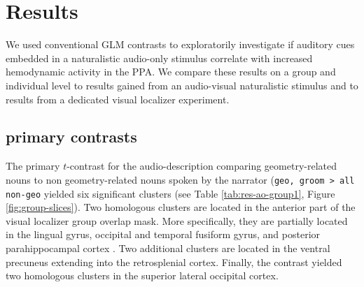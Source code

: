 \documentclass[english]{article}
\begin{document}
\section{Results}

We used conventional GLM contrasts to exploratorily investigate if auditory cues
embedded in a naturalistic audio-only stimulus correlate with increased
hemodynamic activity in the PPA.
We compare these results on a group and individual level to results gained from
an audio-visual naturalistic stimulus and to results from a dedicated visual
localizer experiment.



\subsection{primary contrasts}



The primary $t$-contrast for the audio-description comparing geometry-related
nouns to non geometry-related nouns spoken by the narrator (\texttt{geo, groom >
all non-geo} yielded six significant clusters (see Table
\ref{tab:res-ao-group1}, Figure \ref{fig:group-slices}).
Two homologous clusters are located in the anterior part of the visual localizer
group overlap mask.
More specifically, they are partially located in the lingual gyrus, occipital
and temporal fusiform gyrus, and posterior parahippocampal cortex .
Two additional clusters are located in the ventral precuneus extending into the
retrosplenial cortex.
Finally, the contrast yielded two homologous clusters in the superior lateral
occipital cortex.
\end{document}
